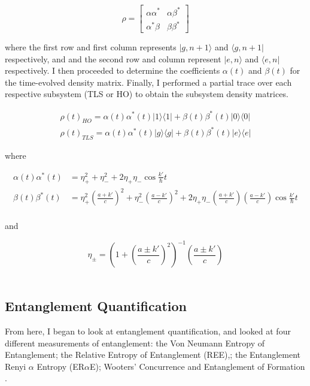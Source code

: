 \documentclass[12pt,a4paper]{article}
\begin{document}
\begin{equation}
    \rho = \begin{bmatrix}
        \alpha\alpha^* & \alpha\beta^* \\
        \alpha^*\beta & \beta\beta^*
    \end{bmatrix}
\end{equation}

where the first row and first column represents $|g,n+1\rangle$ and $\langle g,n+1|$ respectively, and  and the second row and column represent $|e,n\rangle$ and $\langle e,n|$ respectively. I then proceeded to determine the coefficients $\alpha(t)$ and $\beta(t)$ for the time-evolved density matrix. Finally, I performed a partial trace over each respective subsystem (TLS or HO) to obtain the subsystem density matrices.

\begin{align}
    \rho(t)_{HO} = \alpha(t)\alpha^*(t)|1\rangle\langle1| + \beta(t)\beta^*(t)|0\rangle\langle0|
    \\
    \rho(t)_{TLS} = \alpha(t)\alpha^*(t)|g\rangle\langle g| + \beta(t)\beta^*(t)|e\rangle\langle e|
\end{align}

where 

\begin{align*}
    \alpha(t)\alpha^*(t) &=\eta_+^2 + \eta_-^2 + 2\eta_+\eta_-\cos{\frac{k'}{\hbar}t} \\
    \beta(t)\beta^*(t) &= \eta_+^2(\frac{a+k'}{c})^2 + \eta_-^2(\frac{a-k'}{c})^2 + 2\eta_+\eta_-(\frac{a+k'}{c})(\frac{a-k'}{c})\cos{\frac{k'}{\hbar}t} \\
\end{align*}

and 

\begin{equation*}
    \eta_{\pm}= (1+(\frac{a\pm k'}{c})^2)^{-1}(\frac{a\pm k'}{c})
\end{equation*}
\\
\subsection{\normalsize{Entanglement Quantification}}

From here, I began to look at entanglement quantification, and looked at four different measurements of entanglement: the Von Neumann Entropy of Entanglement\cite{DerivationVNEntropy}; the Relative Entropy of Entanglement (REE)\cite{OverviewREE},\cite{GeneratingREE}; the Entanglement Renyi $\alpha$ Entropy (ER$\alpha$E)\cite{DefinitionERaE}; Wooters' Concurrence and Entanglement of Formation \cite{}. 
\end{document}
